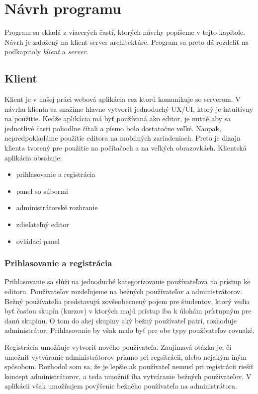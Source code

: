 \chapter{Návrh programu}

\label{kap:design} %

Program sa skladá z viacerých častí, ktorých návrhy popíšeme v tejto kapitole.
Návrh je založený na klient-server architektúre. Program sa preto dá rozdeliť na 
podkapitoly \textit{klient} a \textit{server}.


\section{Klient}
Klient je v našej práci webová aplikácia cez ktorú komunikuje so serverom. 
V návrhu klienta sa snažíme hlavne vytvoriť jednoduchý UX/UI, ktorý je intuitívny na
použitie. Kedže aplikácia má byť používaná ako editor, je nutné aby sa jednotlivé časti pohodlne 
čítali a písmo bolo dostatočne veľké. Naopak, nepredpokladáme použitie editora na mobilných
zariadeniach. Preto je dizajn klienta tvorený pre použitie na počítačoch a na veľkých obrazovkách.
Klientská aplikácia obsahuje:
\begin{itemize}
\item prihlasovanie a registrácia
\item panel so súbormi
\item administrátorské rozhranie
\item zdieľateľný editor
\item ovládací panel
\end{itemize}

\subsection{Prihlasovanie a registrácia}
Prihlasovanie sa slúži na jednoduché kategorizovanie používateľova na prístup ke editoru. 
Používateľov rozdeľujeme na bežných používateľov a administrátorov. Bežný používatelia predstavujú
zovšeobecnený pojem pre študentov, ktorý vedia byť časťou skupín (kurzov) v ktorých majú prístup
iba k úlohám prístupným pre danú skupinu. O tom do akej skupiny aký bežný používateľ patrí, 
rozhoduje administrátor. Prihlasovanie by však malo byť pre obe typy používateľov rovnaké.

Registrácia umožňuje vytvoriť nového používateľa. Zaujímavá otázka je, či umožniť vytváranie
administrátorov priamo pri regsitrácii, alebo nejakým iným spôsobom. Rozhodol som sa, že je lepšie
ak používateľ nemusí pri registrácii riešiť koncept administrátorov, a teda umožniť iba vytváranie
bežných používateľov. V aplikácii však umožňujem povýšenie bežného používateľa na administrátora.


